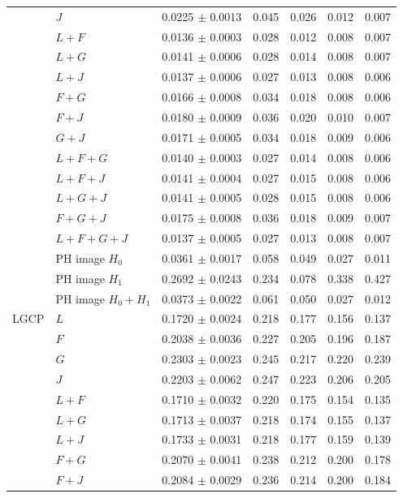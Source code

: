 \begin{longtable}{@{}ll c cccc@{}}
 & $J$ & 0.0225 $\pm$ 0.0013 & 0.045 & 0.026 & 0.012 & 0.007\\
 & $L{+}F$ & 0.0136 $\pm$ 0.0003 & 0.028 & 0.012 & 0.008 & 0.007\\
 & $L{+}G$ & 0.0141 $\pm$ 0.0006 & 0.028 & 0.014 & 0.008 & 0.007\\
 & $L{+}J$ & 0.0137 $\pm$ 0.0006 & 0.027 & 0.013 & 0.008 & 0.006\\
 & $F{+}G$ & 0.0166 $\pm$ 0.0008 & 0.034 & 0.018 & 0.008 & 0.006\\
 & $F{+}J$ & 0.0180 $\pm$ 0.0009 & 0.036 & 0.020 & 0.010 & 0.007\\
 & $G{+}J$ & 0.0171 $\pm$ 0.0005 & 0.034 & 0.018 & 0.009 & 0.006\\
 & $L{+}F{+}G$ & 0.0140 $\pm$ 0.0003 & 0.027 & 0.014 & 0.008 & 0.006\\
 & $L{+}F{+}J$ & 0.0141 $\pm$ 0.0004 & 0.027 & 0.015 & 0.008 & 0.006\\
 & $L{+}G{+}J$ & 0.0141 $\pm$ 0.0005 & 0.028 & 0.015 & 0.008 & 0.006\\
 & $F{+}G{+}J$ & 0.0175 $\pm$ 0.0008 & 0.036 & 0.018 & 0.009 & 0.007\\
 & $L{+}F{+}G{+}J$ & 0.0137 $\pm$ 0.0005 & 0.027 & 0.013 & 0.008 & 0.007\\
 & PH image $H_0$ & 0.0361 $\pm$ 0.0017 & 0.058 & 0.049 & 0.027 & 0.011\\
 & PH image $H_1$ & 0.2692 $\pm$ 0.0243 & 0.234 & 0.078 & 0.338 & 0.427\\
 & PH image $H_0{+}H_1$ & 0.0373 $\pm$ 0.0022 & 0.061 & 0.050 & 0.027 & 0.012\\
\midrule
LGCP & $L$ & 0.1720 $\pm$ 0.0024 & 0.218 & 0.177 & 0.156 & 0.137\\
 & $F$ & 0.2038 $\pm$ 0.0036 & 0.227 & 0.205 & 0.196 & 0.187\\
 & $G$ & 0.2303 $\pm$ 0.0023 & 0.245 & 0.217 & 0.220 & 0.239\\
 & $J$ & 0.2203 $\pm$ 0.0062 & 0.247 & 0.223 & 0.206 & 0.205\\
 & $L{+}F$ & 0.1710 $\pm$ 0.0032 & 0.220 & 0.175 & 0.154 & 0.135\\
 & $L{+}G$ & 0.1713 $\pm$ 0.0037 & 0.218 & 0.174 & 0.155 & 0.137\\
 & $L{+}J$ & 0.1733 $\pm$ 0.0031 & 0.218 & 0.177 & 0.159 & 0.139\\
 & $F{+}G$ & 0.2070 $\pm$ 0.0041 & 0.238 & 0.212 & 0.200 & 0.178\\
 & $F{+}J$ & 0.2084 $\pm$ 0.0029 & 0.236 & 0.214 & 0.200 & 0.184\\

\end{longtable}
